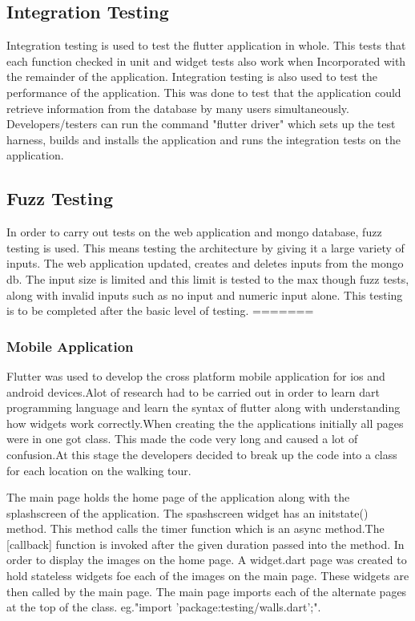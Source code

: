 \subsection{Integration Testing}

Integration testing is used to test the flutter application in whole. This tests that each function checked in unit and widget tests also work when Incorporated with the remainder of the application. Integration testing is also used to test the performance of the application. This was done to test that the application could retrieve information from the database by many users simultaneously. Developers/testers can run the command "flutter driver" which sets up the test harness, builds and installs the application and runs the integration tests on the application. \cite{IntegrationTest}

\subsection{Fuzz Testing}
In order to carry out tests on the web application and mongo database, fuzz testing is used. This means testing the architecture by giving it a large variety of inputs. The web application updated, creates and deletes inputs from the mongo db. The input size is limited and this limit is tested to the max though fuzz tests, along with invalid inputs such as no input and numeric input alone. This testing is to be completed after the basic level of testing.
=======

\subsubsection{Mobile Application}
Flutter was used to develop the cross platform mobile application for ios and android devices.Alot of research had to be carried out in order to learn dart programming language and learn the syntax of flutter along with understanding how widgets work correctly.When creating the the applications initially all pages were in one got class. This made the code very long and caused a lot of confusion.At this stage the developers decided to break up the code into a class for each location on the walking tour.

The main page holds the home page of the application along with the splashscreen of the application. The spashscreen widget has an initstate() method. This method calls the timer function which is an async method.The [callback] function is invoked after the given duration passed into the method. In order to display the images on the home page. A widget.dart page was created to hold stateless widgets foe each of the images on the main page. These widgets are then called by the main page. The main page imports each of the alternate pages at the top of the class. eg."import 'package:testing/walls.dart';".

